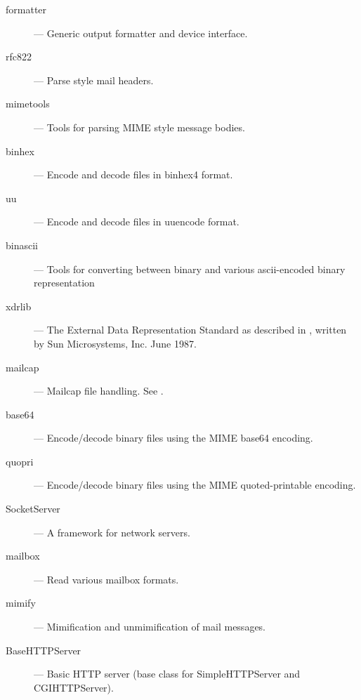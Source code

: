 \begin{description}
\item[formatter]
--- Generic output formatter and device interface.

\item[rfc822]
--- Parse  style mail headers.

\item[mimetools]
--- Tools for parsing MIME style message bodies.

\item[binhex]
--- Encode and decode files in binhex4 format.

\item[uu]
--- Encode and decode files in uuencode format.

\item[binascii]
--- Tools for converting between binary and various ascii-encoded binary 
representation

\item[xdrlib]
--- The External Data Representation Standard as described in ,
written by Sun Microsystems, Inc. June 1987.

\item[mailcap]
--- Mailcap file handling.  See .

\item[base64]
--- Encode/decode binary files using the MIME base64 encoding.

\item[quopri]
--- Encode/decode binary files using the MIME quoted-printable encoding.

\item[SocketServer]
--- A framework for network servers.

\item[mailbox]
--- Read various mailbox formats.

\item[mimify]
--- Mimification and unmimification of mail messages.

\item[BaseHTTPServer]
--- Basic HTTP server (base class for SimpleHTTPServer and CGIHTTPServer).

\end{description}
